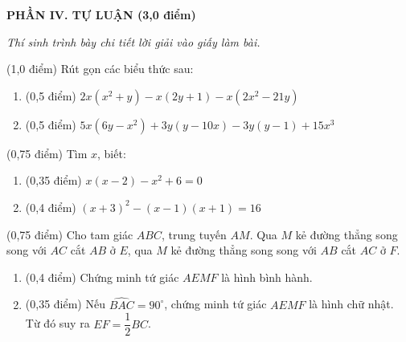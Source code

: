 \documentclass[12pt,a4paper]{article}
\begin{document}
\setcounter{ex}{0}
\noindent\textbf{\large PHẦN IV. TỰ LUẬN (3,0 điểm)}

\textit{Thí sinh trình bày chi tiết lời giải vào giấy làm bài.}

\vspace{1mm}
\begin{ex} (1,0 điểm)
Rút gọn các biểu thức sau:
\begin{enumerate}[label=\textbf{\alph*)}, leftmargin=0.8cm, itemsep=2pt]
\item (0,5 điểm) $2x(x^2 + y) - x(2y + 1) - x(2x^2 - 21y)$
\item (0,5 điểm) $5x(6y - x^2) + 3y(y - 10x) - 3y(y - 1) + 15x^3$
\end{enumerate}
\end{ex}
\vspace{0.5mm}

\begin{ex} (0,75 điểm)
Tìm $x$, biết:
\begin{enumerate}[label=\textbf{\alph*)}, leftmargin=0.8cm, itemsep=2pt]
\item (0,35 điểm) $x(x - 2) - x^2 + 6 = 0$
\item (0,4 điểm) $(x + 3)^2 - (x - 1)(x + 1) = 16$
\end{enumerate}
\end{ex}
\vspace{0.5mm}

\begin{ex} (0,75 điểm)
Cho tam giác $ABC$, trung tuyến $AM$. Qua $M$ kẻ đường thẳng song song với $AC$ cắt $AB$ ở $E$, qua $M$ kẻ đường thẳng song song với $AB$ cắt $AC$ ở $F$.
\begin{center}
\end{center}
\begin{enumerate}[label=\textbf{\alph*)}, leftmargin=0.8cm, itemsep=2pt]
\item (0,4 điểm) Chứng minh tứ giác $AEMF$ là hình bình hành.
\item (0,35 điểm) Nếu $\widehat{BAC} = 90^\circ$, chứng minh tứ giác $AEMF$ là hình chữ nhật. Từ đó suy ra $EF = \dfrac{1}{2}BC$.
\end{enumerate}
\end{ex}
\vspace{0.5mm}
\end{document}
